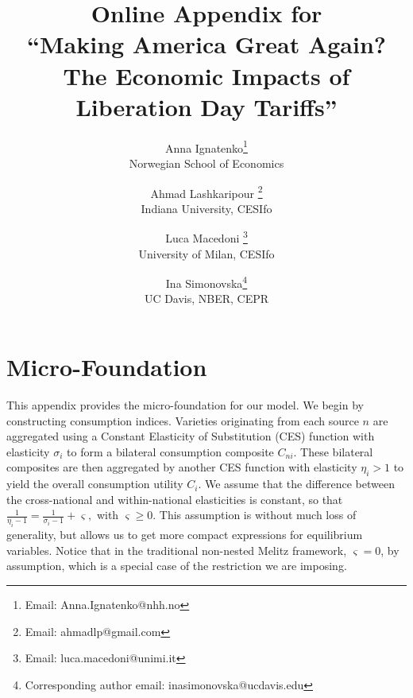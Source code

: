 \documentclass[12pt]{article}
\date{}
\begin{document}
\appendices
\title{Online Appendix for \\``Making America Great Again? \\ The Economic Impacts of Liberation Day Tariffs''}

\author{
Anna Ignatenko\footnote{Email: Anna.Ignatenko@nhh.no}
\smallskip{}\\
Norwegian School of Economics
 \and 
Ahmad Lashkaripour \footnote{Email: ahmadlp@gmail.com}
\smallskip{}\\
Indiana University, CESIfo
\and
Luca Macedoni \footnote{Email: luca.macedoni@unimi.it}
\smallskip{}\\
University of Milan, CESIfo 
\and 
Ina Simonovska\footnote{Corresponding author email: inasimonovska@ucdavis.edu}
 \smallskip{}\\
UC Davis, NBER, CEPR
\bigskip{}}


\maketitle


\onehalfspacing

\section{Micro-Foundation}
\label{app:microfoundation}
This appendix provides the micro-foundation for our model. We begin by constructing consumption indices. Varieties originating from each source \( n \) are aggregated using a Constant Elasticity of Substitution (CES) function with elasticity \( \sigma_i \) to form a bilateral consumption composite \( C_{ni} \). These bilateral composites are then aggregated by another CES function with elasticity \( \eta_i > 1 \) to yield the overall consumption utility \( C_i \). We assume that the difference between the cross-national and within-national elasticities is constant, so that $\frac{1}{\eta_i-1} = \frac{1}{\sigma_i-1} + \varsigma,$ with \(\varsigma \ge 0\). This assumption is without much loss of generality, but allows us to get more compact expressions for equilibrium variables. Notice that in the traditional non-nested Melitz framework,  $\varsigma=0$, by assumption, which is a special case of the restriction we are imposing.
\end{document}
